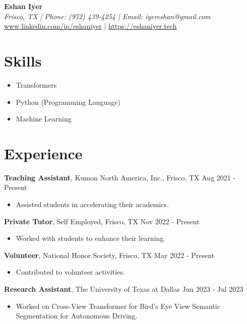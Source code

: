 \documentclass[a4paper, 10pt]{article}
\begin{document}
\pagestyle{empty}

\begin{center}
    \textbf{\LARGE Eshan Iyer}\\
    \textit{Frisco, TX | Phone: (972) 439-4254 | Email: iyereshan@gmail.com}\\
    \url{www.linkedin.com/in/eshaniyer} | \url{https://eshaniyer.tech}
\end{center}


\section*{Skills}
\begin{itemize}[left=0pt, itemsep=0pt, label={\textbullet}]
    \item Transformers \item Python (Programming Language) \item Machine Learning
\end{itemize}

\section*{Experience}
\textbf{Teaching Assistant}, Kumon North America, Inc., Frisco, TX \hfill Aug 2021 - Present
\begin{itemize}[left=0pt, itemsep=0pt]
    \item Assisted students in accelerating their academics.
\end{itemize}

\vspace{12pt}

\textbf{Private Tutor}, Self Employed, Frisco, TX \hfill Nov 2022 - Present
\begin{itemize}[left=0pt, itemsep=0pt]
    \item Worked with students to enhance their learning.
\end{itemize}

\vspace{12pt}

\textbf{Volunteer}, National Honor Society, Frisco, TX \hfill May 2022 - Present
\begin{itemize}[left=0pt, itemsep=0pt]
    \item Contributed to volunteer activities.
\end{itemize}

\vspace{12pt}

\textbf{Research Assistant}, The University of Texas at Dallas \hfill Jun 2023 - Jul 2023
\begin{itemize}[left=0pt, itemsep=0pt]
    \item Worked on Cross-View Transformer for Bird’s Eye View Semantic Segmentation for Autonomous Driving.
\end{itemize}
\end{document}
